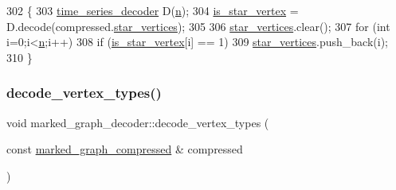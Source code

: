 \begin{DoxyCode}
302 \{
303   \hyperlink{classtime__series__decoder}{time\_series\_decoder} D(\hyperlink{classmarked__graph__decoder_aefc93611bc4a3e9a5d3956d97649a0e9}{n});
304   \hyperlink{classmarked__graph__decoder_a5c5391206cf2965b8513248e505ba48f}{is\_star\_vertex} = D.decode(compressed.\hyperlink{classmarked__graph__compressed_a7a4ced4586e2e353f9076bd447df5208}{star\_vertices});
305 
306   \hyperlink{classmarked__graph__decoder_a06fc05827db14b675f7ecc2fd915b533}{star\_vertices}.clear();
307   \textcolor{keywordflow}{for} (\textcolor{keywordtype}{int} i=0;i<\hyperlink{classmarked__graph__decoder_aefc93611bc4a3e9a5d3956d97649a0e9}{n};i++)
308     \textcolor{keywordflow}{if} (\hyperlink{classmarked__graph__decoder_a5c5391206cf2965b8513248e505ba48f}{is\_star\_vertex}[i] == 1)
309       \hyperlink{classmarked__graph__decoder_a06fc05827db14b675f7ecc2fd915b533}{star\_vertices}.push\_back(i);
310 \}
\end{DoxyCode}
\mbox{\label{classmarked__graph__decoder_afc0aea714483a4dda31dd85fd20bfe5f}} 
\subsubsection{\texorpdfstring{decode\+\_\+vertex\+\_\+types()}{decode\_vertex\_types()}}
{\footnotesize\ttfamily void marked\+\_\+graph\+\_\+decoder\+::decode\+\_\+vertex\+\_\+types (\begin{DoxyParamCaption}\item[{const \hyperlink{classmarked__graph__compressed}{marked\+\_\+graph\+\_\+compressed} \&}]{compressed }\end{DoxyParamCaption})\hspace{0.3cm}{\ttfamily [private]}}


